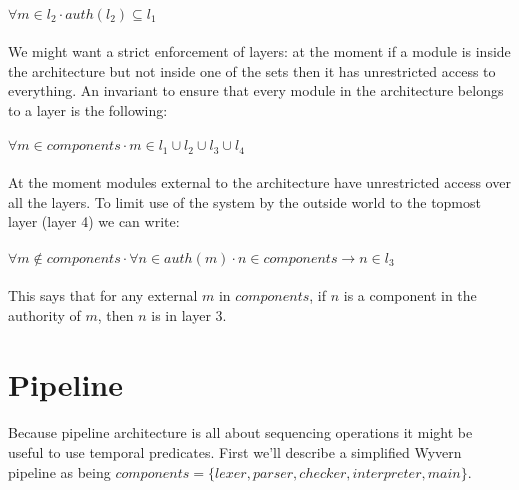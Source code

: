 \documentclass{article}
\begin{document}
\paragraph{}
$\forall m \in l_2 \cdot auth(l_2) \subseteq l_1$

\paragraph{}
We might want a strict enforcement of layers: at the moment if a module is inside the architecture but not inside one of the sets then it has unrestricted access to everything. An invariant to ensure that every module in the architecture belongs to a layer is the following:

\paragraph{}
$\forall m \in components \cdot m \in l_1 \cup l_2 \cup l_3 \cup l_4$

\paragraph{}
At the moment modules external to the architecture have unrestricted access over all the layers. To limit use of the system by the outside world to the topmost layer (layer 4) we can write:

\paragraph{}
$\forall m \notin components \cdot \forall n \in auth(m) \cdot n \in components \rightarrow n \in l_3$

\paragraph{}
This says that for any external $m$ in $components$, if $n$ is a component in the authority of $m$, then $n$ is in layer 3.

\section{Pipeline}

\paragraph{}
Because pipeline architecture is all about sequencing operations it might be useful to use temporal predicates. First we'll describe a simplified Wyvern pipeline as being $components = \{lexer, parser, checker, interpreter, main\}$.
\end{document}
